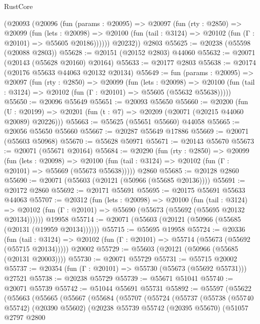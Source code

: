 \begin{lexlean}{RustCore}
\begin{coremodule}
      (@20093
        (@20096
          (fun (params : @20095) =>
          @20097
            (fun (rty : @2850) =>
            @20099
              (fun (lets : @20098) =>
              @20100 (fun (tail : @3124) => @20102 (fun (Γ : @20101) => @55605 @20186))))))
        @20232))
    @2803
@55625 := @20238 (@55598 (@20088 @2803))
@55628 := @20151 (@20152 @2803) @44060
@55632 := @20071 (@20143 (@55628 @20160) @20164)
@55633 := @20177 @2803
@55638 := @20174 (@20176 @55633 @44063 @20132 @20134)
@55649 := fun (params : @20095) =>
  @20097
    (fun (rty : @2850) =>
    @20099
      (fun (lets : @20098) =>
      @20100 (fun (tail : @3124) => @20102 (fun (Γ : @20101) => @55605 (@55632 @55638)))))
@55650 := @20096 @55649
@55651 := @20093 @55650
@55660 := @20200
    (fun (U : @20199) => @20201 (fun (t : @7) => @20209 (@20071 (@20215 @44060 @20089) @20226)))
@55663 := @55625 (@55651 @55660) @44058
@55665 := @20056 @55650 @55660
@55667 := @20287 @55649 @17886
@55669 := @20071 (@55603 @50968)
@55670 := @55628 @50971
@55671 := @20143 @55670
@55673 := @20071 (@55671 @20164)
@55684 := @20290
    (fun (rty : @2850) =>
    @20099
      (fun (lets : @20098) =>
      @20100 (fun (tail : @3124) => @20102 (fun (Γ : @20101) => @55669 (@55673 @55638)))))
    @2860
@55685 := @20128 @2860
@55690 := @20071 (@55603 (@20121 (@50966 (@55685 @20136))))
@55691 := @20172 @2860
@55692 := @20171 @55691
@55695 := @20175 @55691 @55633 @44063
@55707 := @20312
    (fun (lets : @20098) =>
    @20100
      (fun (tail : @3124) =>
      @20102 (fun (Γ : @20101) => @55690 (@55673 (@55692 (@55695 @20132 @20134))))))
    @19958
@55714 := @20071 (@55603 (@20121 (@50966 (@55685 (@20131 (@19959 @20134))))))
@55715 := @55695 @19958
@55724 := @20336
    (fun (tail : @3124) => @20102 (fun (Γ : @20101) => @55714 (@55673 (@55692 (@55715 @20134)))))
    @20002
@55729 := @55603 (@20121 (@50966 (@55685 (@20131 @20003))))
@55730 := @20071 @55729
@55731 := @55715 @20002
@55737 := @20354 (fun (Γ : @20101) => @55730 (@55673 (@55692 @55731))) @27521
@55738 := @20238 @55729
@55739 := @55671 @51041
@55740 := @20071 @55739
@55742 := @51044 @55691 @55731
@55892 := @55597
    (@55622
      (@55663
        (@55665
          (@55667
            (@55684
              (@55707
                (@55724
                  (@55737
                    (@55738
                      (@55740 @55742)
                      (@20390 @55602)
                      (@20238
                        @55739
                        @55742
                        (@20395 @55670)
                        (@51057
                          @2797
                          @2800

\end{coremodule}
\end{lexlean}
